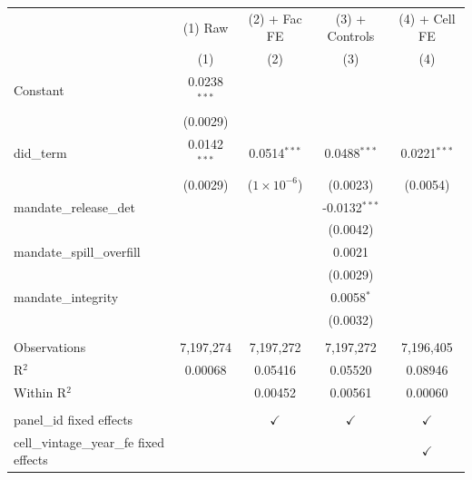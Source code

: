 
\begingroup
\centering
\begin{tabular}{lcccc}
   \toprule
                                            & (1) Raw        & (2) + Fac FE         & (3) + Controls  & (4) + Cell FE \\   
                                            & (1)            & (2)                  & (3)             & (4)\\  
   \midrule 
   Constant                                 & 0.0238$^{***}$ &                      &                 &   \\   
                                            & (0.0029)       &                      &                 &   \\   
   did\_term                                & 0.0142$^{***}$ & 0.0514$^{***}$       & 0.0488$^{***}$  & 0.0221$^{***}$\\   
                                            & (0.0029)       & ($1\times 10^{-6}$)  & (0.0023)        & (0.0054)\\   
   mandate\_release\_det                    &                &                      & -0.0132$^{***}$ &   \\   
                                            &                &                      & (0.0042)        &   \\   
   mandate\_spill\_overfill                 &                &                      & 0.0021          &   \\   
                                            &                &                      & (0.0029)        &   \\   
   mandate\_integrity                       &                &                      & 0.0058$^{*}$    &   \\   
                                            &                &                      & (0.0032)        &   \\   
    \\
   Observations                             & 7,197,274      & 7,197,272            & 7,197,272       & 7,196,405\\  
   R$^2$                                    & 0.00068        & 0.05416              & 0.05520         & 0.08946\\  
   Within R$^2$                             &                & 0.00452              & 0.00561         & 0.00060\\  
    \\
   panel\_id fixed effects                  &                & $\checkmark$         & $\checkmark$    & $\checkmark$\\   
   cell\_vintage\_year\_fe fixed effects    &                &                      &                 & $\checkmark$\\   
   \bottomrule
\end{tabular}
\par\endgroup


